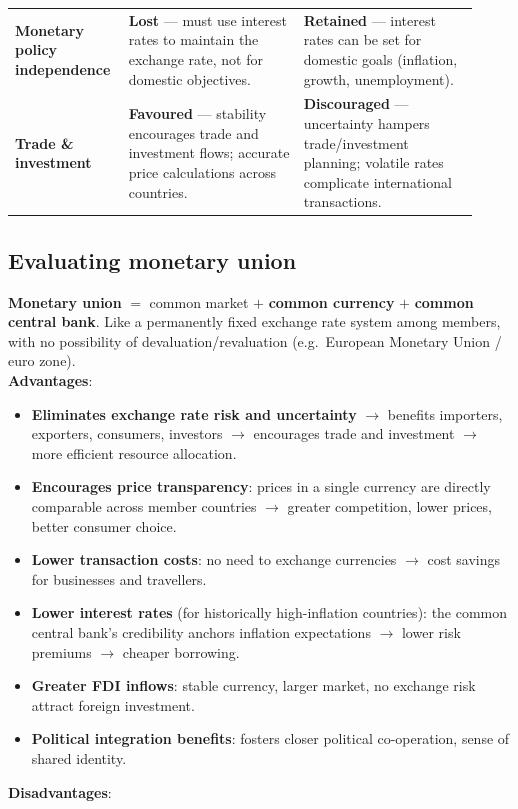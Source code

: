 \documentclass[a4paper,12pt]{article}
\newcommand{\needbold}[1]{\textcolor{red!70!black}{\textbf{#1}}}
\begin{document}
\begin{center}
\begin{tabular}{p{0.2\linewidth}|p{0.36\linewidth}|p{0.36\linewidth}}
\textbf{Monetary policy independence} & \textbf{Lost} --- must use interest rates to maintain the exchange rate, not for domestic objectives. & \textbf{Retained} --- interest rates can be set for domestic goals (inflation, growth, unemployment). \\
\textbf{Trade \& investment} & \textbf{Favoured} --- stability encourages trade and investment flows; accurate price calculations across countries. & \textbf{Discouraged} --- uncertainty hampers trade/investment planning; volatile rates complicate international transactions. \\
\bottomrule
\end{tabular}
\end{center}
\subsection{Evaluating monetary union}
\needbold{Monetary union} $=$ common market $+$ \textbf{common currency} $+$ \textbf{common central bank}. Like a permanently fixed exchange rate system among members, with no possibility of devaluation/revaluation (e.g.\ European Monetary Union / euro zone).
\\
\textbf{Advantages}:
\begin{itemize}
  \item \textbf{Eliminates exchange rate risk and uncertainty} $\to$ benefits importers, exporters, consumers, investors $\to$ encourages trade and investment $\to$ more efficient resource allocation.
  \item \textbf{Encourages price transparency}: prices in a single currency are directly comparable across member countries $\to$ greater competition, lower prices, better consumer choice.
  \item \textbf{Lower transaction costs}: no need to exchange currencies $\to$ cost savings for businesses and travellers.
  \item \textbf{Lower interest rates} (for historically high-inflation countries): the common central bank's credibility anchors inflation expectations $\to$ lower risk premiums $\to$ cheaper borrowing.
  \item \textbf{Greater FDI inflows}: stable currency, larger market, no exchange risk attract foreign investment.
  \item \textbf{Political integration benefits}: fosters closer political co-operation, sense of shared identity.
\end{itemize}
\textbf{Disadvantages}:
\end{document}
